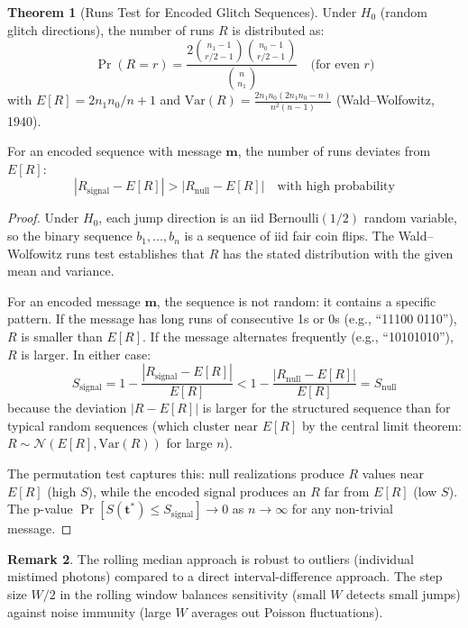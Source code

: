 \documentclass[11pt]{article}
\theoremstyle{definition}
\newtheorem{theorem}{Theorem}[section]
\newtheorem{remark}[theorem]{Remark}
\begin{document}
\begin{theorem}[Runs Test for Encoded Glitch Sequences]
\label{thm:runs}
Under $H_0$ (random glitch directions), the number of runs $R$ is distributed as:
\begin{equation}
\Pr(R = r) = \frac{2\binom{n_1-1}{r/2-1}\binom{n_0-1}{r/2-1}}{\binom{n}{n_1}} \quad \text{(for even } r\text{)}
\end{equation}
with $E[R] = 2n_1 n_0 / n + 1$ and $\mathrm{Var}(R) = \frac{2n_1 n_0(2n_1 n_0 - n)}{n^2(n-1)}$ (Wald--Wolfowitz, 1940).

For an encoded sequence with message $\mathbf{m}$, the number of runs deviates from $E[R]$:
\begin{equation}
|R_{\text{signal}} - E[R]| > |R_{\text{null}} - E[R]| \quad \text{with high probability}
\end{equation}
\end{theorem}

\begin{proof}
Under $H_0$, each jump direction is an iid Bernoulli$(1/2)$ random variable, so the binary sequence $b_1, \ldots, b_n$ is a sequence of iid fair coin flips. The Wald--Wolfowitz runs test establishes that $R$ has the stated distribution with the given mean and variance.

For an encoded message $\mathbf{m}$, the sequence is not random: it contains a specific pattern. If the message has long runs of consecutive 1s or 0s (e.g., ``11100 0110''), $R$ is smaller than $E[R]$. If the message alternates frequently (e.g., ``10101010''), $R$ is larger. In either case:
\begin{equation}
S_{\text{signal}} = 1 - \frac{|R_{\text{signal}} - E[R]|}{E[R]} < 1 - \frac{|R_{\text{null}} - E[R]|}{E[R]} = S_{\text{null}}
\end{equation}
because the deviation $|R - E[R]|$ is larger for the structured sequence than for typical random sequences (which cluster near $E[R]$ by the central limit theorem: $R \sim \mathcal{N}(E[R], \mathrm{Var}(R))$ for large $n$).

The permutation test captures this: null realizations produce $R$ values near $E[R]$ (high $S$), while the encoded signal produces an $R$ far from $E[R]$ (low $S$). The p-value $\Pr[S(\mathbf{t}^{\ast}) \le S_{\text{signal}}] \to 0$ as $n \to \infty$ for any non-trivial message.
\end{proof}

\begin{remark}
The rolling median approach is robust to outliers (individual mistimed photons) compared to a direct interval-difference approach. The step size $W/2$ in the rolling window balances sensitivity (small $W$ detects small jumps) against noise immunity (large $W$ averages out Poisson fluctuations).
\end{remark}
\end{document}
